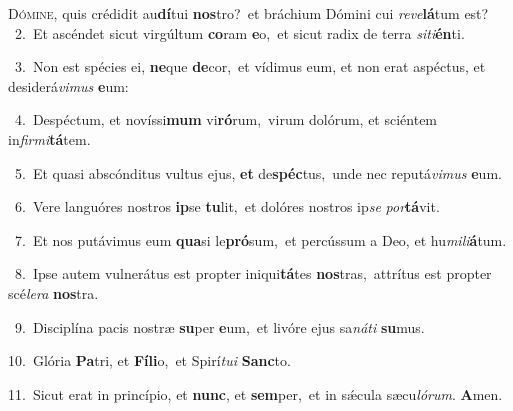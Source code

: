 \lettrine{\initial\textcolor{\initialcolor}{D}}{ómine,} quis crédidit au\-\textbf{dí}\-tui \textbf{nos}\-tro?~\star et bráchium Dómini cui \textit{re}\-\textit{ve}\textbf{lá}tum est?\\
{\numbfont\textcolor{\numbcolor}{~2.}}~Et ascéndet sicut virgúltum \textbf{co}\-ram \textbf{e}\-o,~\star et sicut radix de terra \textit{si}\-\textit{ti}\textbf{én}ti.\par
{\numbfont\textcolor{\numbcolor}{~3.}}~Non est spécies ei, \textbf{ne}\-que \textbf{de}\-cor,~\star et vídimus eum, et non erat aspéctus, et desiderá\-\textit{vi}\-\textit{mus} \textbf{e}\-um:\par
{\numbfont\textcolor{\numbcolor}{~4.}}~Despéctum, et novíssi\textbf{mum} vi\-\textbf{ró}\-rum,~\star virum dolórum, et sciéntem in\-\textit{fir}\-\textit{mi}\textbf{tá}tem.\par
{\numbfont\textcolor{\numbcolor}{~5.}}~Et quasi abscónditus vultus ejus, \textbf{et} de\-\textbf{spéc}\-tus,~\star unde nec reputá\-\textit{vi}\-\textit{mus} \textbf{e}\-um.\par
{\numbfont\textcolor{\numbcolor}{~6.}}~Vere languóres nostros \textbf{ip}\-se \textbf{tu}\-lit,~\star et dolóres nostros ip\textit{se} \textit{por}\-\textbf{tá}vit.\par
{\numbfont\textcolor{\numbcolor}{~7.}}~Et nos putávimus eum \textbf{qua}\-si le\-\textbf{pró}\-sum,~\star et percússum a Deo, et hu\-\textit{mi}\-\textit{li}\textbf{á}tum.\par
{\numbfont\textcolor{\numbcolor}{~8.}}~Ipse autem vulnerátus est propter iniqui\-\textbf{tá}\-tes \textbf{nos}\-tras,~\star attrítus est propter scé\-\textit{le}\-\textit{ra} \textbf{nos}\-tra.\par
{\numbfont\textcolor{\numbcolor}{~9.}}~Disciplína pacis nostræ \textbf{su}\-per \textbf{e}\-um,~\star et livóre ejus sa\-\textit{ná}\-\textit{ti} \textbf{su}\-mus.\par
{\numbfont\textcolor{\numbcolor}{10.}}~Glória \textbf{Pa}\-tri, et \textbf{Fí}\-\textbf{li}o,~\star et Spirí\-\textit{tu}\-\textit{i} \textbf{Sanc}\-to.\par
{\numbfont\textcolor{\numbcolor}{11.}}~Sicut erat in princípio, et \textbf{nunc}\-, et \textbf{sem}\-per,~\star et in sǽcula sæcu\-\textit{ló}\-\textit{rum}. \textbf{A}\-men.\par
